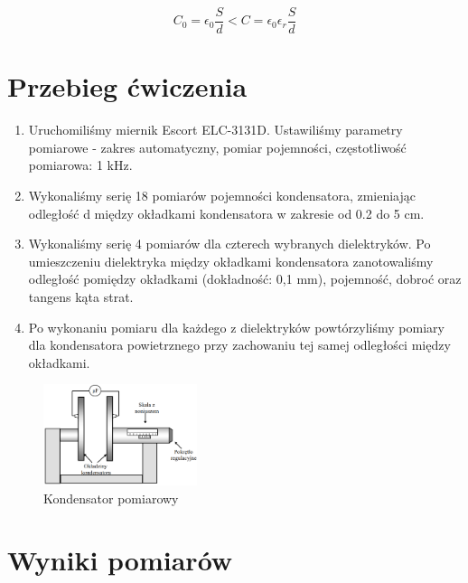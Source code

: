 \documentclass[polish, a4paper]{article}
\begin{document}
\begin{equation}
C_0 = \epsilon_0 \frac{S}{d} < C = \epsilon_0 \epsilon_r \frac{S}{d}
\end{equation}
\section{Przebieg ćwiczenia}

\begin{enumerate}
\item {Uruchomiliśmy miernik Escort ELC-3131D. Ustawiliśmy parametry pomiarowe - zakres automatyczny, pomiar pojemności, częstotliwość pomiarowa: 1 kHz.}
\item {Wykonaliśmy serię 18 pomiarów pojemności kondensatora, zmieniając odległość d między okładkami kondensatora w zakresie od 0.2 do 5 cm.}
\item {Wykonaliśmy serię 4 pomiarów dla czterech wybranych dielektryków. Po umieszczeniu dielektryka między okładkami kondensatora zanotowaliśmy odległość pomiędzy okładkami (dokładność: 0,1 mm), pojemność, dobroć oraz tangens kąta strat.}
\item {Po wykonaniu pomiaru dla każdego z dielektryków powtórzyliśmy pomiary dla kondensatora powietrznego przy zachowaniu tej samej odległości między okładkami.}
\end{enumerate}

\begin{figure}[H]
\centering
\includegraphics[width=0.4\textwidth]{kondensator pomiarowy.png}
\caption{Kondensator pomiarowy}
\end{figure}

\section{Wyniki pomiarów}
\end{document}
